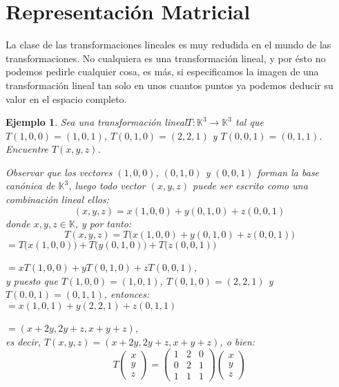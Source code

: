 \documentclass[12pt]{book}
\newtheorem{ejem}{Ejemplo}
\def\K{\mathbb{K}}
\begin{document}
\section{Representación Matricial}


La clase de las transformaciones lineales es muy redudida en el mundo de las transformaciones.
No cualquiera es una transformación lineal, y por ésto no podemos pedirle cualquier cosa, es más, si especificamos la imagen de una transformación lineal tan solo en unos cuantos puntos ya podemos deducir su valor en el espacio completo.

\begin{ejem}
  Sea una transformación lineal\;\;$T:\K^3\rightarrow\K^3$ tal que $T(1,0,0)=(1,0,1)$, $T(0,1,0)=(2,2,1)$ y $T(0,0,1)=(0,1,1)$. Encuentre $T(x,y,z)$.
  
{\em 
Observar que los vectores $(1,0,0)$, $(0,1,0)$ y $(0,0,1)$ forman la base can\'onica de $\K^3$, luego todo vector $(x,y,z)$ puede ser escrito como una combinaci\'on lineal ellos:
$$(x,y,z)=x(1,0,0)+y(0,1,0)+z(0,0,1)$$
donde $x,y,z\in\K$, y por tanto:
$$T(x,y,z)=T\Big(x(1,0,0)+y(0,1,0)+z(0,0,1)\Big)$$
\hspace{6.3 cm}$=T\Big(x(1,0,0)\Big)+T\Big(y(0,1,0)\Big)+T\Big(z(0,0,1)\Big)$

\hspace{6.3 cm}$=xT(1,0,0)+yT(0,1,0)+zT(0,0,1)$,\\

y puesto que $T(1,0,0)=(1,0,1)$, $T(0,1,0)=(2,2,1)$ y $T(0,0,1)=(0,1,1)$, entonces:\\

\hspace{6.3 cm}$=x(1,0,1)+y(2,2,1)+z(0,1,1)$

\hspace{6.3 cm}$=(x+2y,2y+z,x+y+z)$,\\

es decir, $T(x,y,z)=(x+2y,2y+z,x+y+z)$, o bien:
$$T\left(\begin{array}{c} x\\y \\ z\end{array}\right)=\left(\begin{array}{ccc} 1 & 2 & 0 \\ 0 &2 &1 \\ 1 & 1 & 1\end{array}\right)\left(\begin{array}{c} x\\y \\ z\end{array}\right)$$
}
\end{ejem}
 
\end{document}
